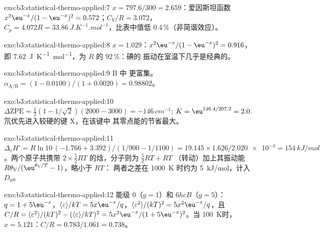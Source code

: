 \begin{solution}{exo:b3:statistical-thermo-applied:7}
$x = 797.6/300 = 2.659$：爱因斯坦函数 $x^2\eu^{-x}/(1 - \eu^{-x})^2 = 0.572$；$C_V/R = 3.072$，
$C_p = 4.072R = \qty{33.86}{J.K^{-1}.mol^{-1}}$，比表中值低 0.4\,\%（非简谐效应）。
\end{solution}

\begin{solution}{exo:b3:statistical-thermo-applied:8}
$x = 1.029$：$x^2\eu^{-x}/(1 - \eu^{-x})^2 = 0.916$，即 \qty{7.62}{J.K^{-1}.mol^{-1}}，为 $R$ 的 92\,\%：碘的
振动在室温下几乎是经典的。
\end{solution}

\begin{solution}{exo:b3:statistical-thermo-applied:9}
B 中  更富集。$\alpha_{\mathrm{A/B}} = (1 - 0.0100)/(1 + 0.0020) = 0.98802$。
\end{solution}

\begin{solution}{exo:b3:statistical-thermo-applied:10}
$\Delta\mathrm{ZPE} = \frac12(1 - 1/\sqrt2)(2000 - 3000) = \qty{-146}{cm^{-1}}$; $K = \eu^{146.4/207.2} = 2.0$.
氘优先进入较硬的键 X，在该键中
其零点能的节省最大。
\end{solution}

\begin{solution}{exo:b3:statistical-thermo-applied:11}
$\Delta_rH^\circ = R\ln10\,(-1.766 + 3.392)/(1/900 - 1/1100) = 19.145 \times 1.626/\num{2.020e-4} =
\qty{154}{kJ/mol}$。两个原子共携带 $2 \times \frac52RT$ 的焓，分子则为 $\frac52RT + RT$
（转动）加上其振动能 $R\theta_{\mathrm V}/(\eu^{\theta_{\mathrm V}/T} - 1)$，略小于 $RT$：
两者之差在 \qty{1000}{K} 时约为 \qty{5}{kJ/mol}，计入 $D_0$。
\end{solution}

\begin{solution}{exo:b3:statistical-thermo-applied:12}
能级 0（$g = 1$）和 $6hcB$（$g = 5$）：$q = 1 + 5\eu^{-x}$，$\langle\varepsilon\rangle/kT = 5x\eu^{-x}/q$，$\langle\varepsilon^2\rangle/(kT)^2 =
5x^2\eu^{-x}/q$，且 $C/R = \langle\varepsilon^2\rangle/(kT)^2 - (\langle\varepsilon\rangle/kT)^2 = 5x^2\eu^{-x}/(1 + 5\eu^{-x})^2$。当
\qty{100}{K}时，$x = 5.121$：$C/R = 0.783/1.061 = 0.738$。
\end{solution}


